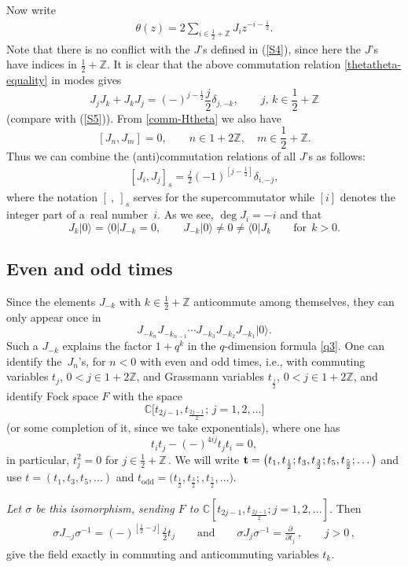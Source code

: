 Now write
\begin{gather}\label{theta(z)}
\theta(z)=2\sum_{i\in\frac{1}{2}+\mathbb{Z}}
J_iz^{-i-\frac{1}{2}} .
\end{gather}
Note that there is no conf\/lict with the $J$'s def\/ined in (\ref{S4}), since here the $J$'s
have indices in $\frac{1}{2}+\mathbb{Z}$.
It is clear that the above commutation
relation \eqref{thetatheta-equality} in modes gives
\[
J_jJ_k+J_kJ_j=(-)^{j-\frac{1}{2}}\frac{j}2 \delta_{j,-k},\qquad j,\,k\in \frac{1}{2}+\mathbb{Z}
\]
(compare with (\ref{S5})). From \eqref{comm-Htheta} we also have
\[
[J_n, J_m]=0 ,\qquad n\in 1+2\mathbb{Z},\quad  m\in \frac{1}{2}+\mathbb{Z} .
\]
Thus we can combine the (anti)commutation relations of all $J$'s as follows:
 \begin{gather}\label{supercurrent}
[J_i, J_j]_s = \frac{j}{2}(-1)^{[j-\frac 12]}\delta_{i,-j} ,
 \end{gather}
where the notation $[\ {,}\ ]_s$ serves for the supercommutator while
$[i]$ denotes the integer part of a~real number~$i$. As we see,
$\deg J_i=-i$
 and that
\[
J_k|0\rangle=\langle 0|J_{-k}=0,\qquad
J_{-k}|0\rangle\ne 0\ne\langle 0|J_{k} \qquad\mbox{for}\ \ k>0 .
\]

\subsection{Even and odd times} \label{Even and odd times}
Since the elements $J_{-k}$ with $k\in \frac{1}{2}+\mathbb{Z}$
anticommute among themselves, they can only
appear once in
\[
J_{-k_n}J_{-k_{n-1}}\cdots J_{-k_3}J_{-k_2}J_{-k_1}|0\rangle.
\]
Such a $J_{-k}$ explains the factor $1+q^k$ in the
$q$-dimension formula \eqref{q3}. One can identify the~$J_n$'s, for $n<0$ with even and odd times, i.e., with  commuting
variables $t_j$, $0<j\in 1+2\mathbb{Z}$, and Grassmann variables $t_{\frac{j}2}$, $0<j\in
1+2\mathbb{Z}$, and identify Fock space $F$ with the space
\[
\mathbb{C}\big[t_{2j-1},t_{\frac{2j-1}2};\, j=1,2,\ldots \big]
\]
(or some completion of it, since we take exponentials),
where one has
\[
t_it_j-(-)^{4ij}t_jt_i=0 ,
\]
in particular, $t_j^2=0$ for $j\in \frac12+\mathbb{Z}$\,.
We will write ${\bf t}=\bigl(t_1,t_{\frac 12};t_3,t_{\frac 32};t_5,t_{\frac
52};\dots \bigr)$ and use $t=\left(t_1,t_3,t_5,\dots \right)$ and
$t_\mathrm{odd}=\bigl(t_{\frac 12},t_{\frac 32};,t_{\frac
52},\dots \bigr)$.


{\it Let $\sigma$ be this isomorphism,
sending $F$ to $\mathbb{C}[t_{2j-1},t_{\frac{2j-1}2}; j=1,2,\ldots]$.}
Then
\begin{gather}\label{theta-xi}
\sigma J_{-j}\sigma^{-1}=(-)^{[\frac{1}{2}-j]}\frac{j}2t_j\qquad\mbox{and}\qquad
\sigma J_j\sigma^{-1}=\frac{\partial}{\partial t_j}\,,\qquad
j>0\,,
\end{gather}
give the f\/ield exactly in commuting and anticommuting variables
$t_k$.


